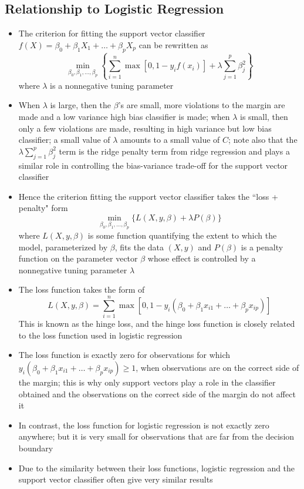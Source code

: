 \documentclass[12pt]{article}
\begin{document}
\subsection{Relationship to Logistic Regression} 
\begin{itemize} 
\item The criterion for fitting the support vector classifier $f(X) = \beta_0 + \beta_1X_1 + \dots + \beta_pX_p$ can be rewritten as $$ \min_{\beta_0,\beta_1,\dots,\beta_p} \left\{ \sum_{i=1}^n \max [0, 1 - y_if(x_i)] + \lambda \sum_{j=1}^p \beta_j^2 \right\} $$ where $\lambda$ is a nonnegative tuning parameter
\item When $\lambda$ is large, then the $\beta$'s are small, more violations to the margin are made and a low variance high bias classifier is made; when $\lambda$ is small, then only a few violations are made, resulting in high variance but low bias classifier; a small value of $\lambda$ amounts to a small value of $C$; note also that the $\lambda \sum_{j=1}^p \beta_j^2$ term is the ridge penalty term from ridge regression and plays a similar role in controlling the bias-variance trade-off for the support vector classifier
\item Hence the criterion fitting the support vector classifier takes the ``loss + penalty" form $$ \min_{\beta_0,\beta_1,\dots,\beta_p} \{ L(X,y,\beta) + \lambda P(\beta)\} $$ where $L(X,y,\beta)$ is some function quantifying the extent to which the model, parameterized by $\beta$, fits the data $(X,y)$ and $P(\beta)$ is a penalty function on the parameter vector $\beta$ whose effect is controlled by a nonnegative tuning parameter $\lambda$ 
\item The loss function takes the form of $$ L(X,y,\beta) = \sum_{i=1}^n \max[0, 1 - y_i(\beta_0 + \beta_1x_{i1} + \dots + \beta_px_{ip})] $$ This is known as the hinge loss, and the hinge loss function is closely related to the loss function used in logistic regression 
\item The loss function is exactly zero for observations for which $y_i(\beta_0 + \beta_1x_{i1} + \dots + \beta_px_{ip}) \geq 1$, when observations are on the correct side of the margin; this is why only support vectors play a role in the classifier obtained and the observations on the correct side of the margin do not affect it 
\item In contrast, the loss function for logistic regression is not exactly zero anywhere; but it is very small for observations that are far from the decision boundary
\item Due to the similarity between their loss functions, logistic regression and the support vector classifier often give very similar results 

\end{itemize}
\end{document}
